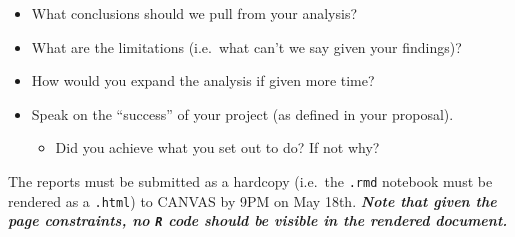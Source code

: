 \documentclass[
  12pt,
]{article}
\providecommand{\tightlist}{%
  \setlength{\itemsep}{0pt}\setlength{\parskip}{0pt}}
\begin{document}
\begin{itemize}
  \begin{itemize}
  \item
    What conclusions should we pull from your analysis?
  \item
    What are the limitations (i.e.~what can't we say given your
    findings)?
  \item
    How would you expand the analysis if given more time?
  \item
    Speak on the ``success'' of your project (as defined in your
    proposal).

    \begin{itemize}
    \tightlist
    \item
      Did you achieve what you set out to do? If not why?
    \end{itemize}
  \end{itemize}
\end{itemize}

The reports must be submitted as a hardcopy (i.e.~the \texttt{.rmd}
notebook must be rendered as a \texttt{.html}) to CANVAS by 9PM on May
18th. \textbf{\emph{Note that given the page constraints, no \texttt{R}
code should be visible in the rendered document.}}
\end{document}

